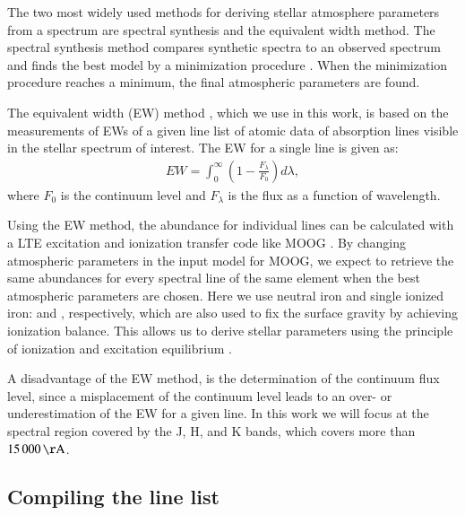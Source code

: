 \documentclass{aa}
\begin{document}
The two most widely used methods for deriving stellar atmosphere
parameters from a spectrum are spectral synthesis and the equivalent
width method. The spectral synthesis method compares synthetic spectra
to an observed spectrum and finds the best model by a minimization
procedure \citep[see e.g.][]{Valenti2005,Onehag2012,Blanco2014}. When
the minimization procedure reaches a minimum, the final atmospheric
parameters are found.

The equivalent width (EW) method
\citep{Sousa2008a,Bensby2014,Mucciarelli2013}, which we use in this
work, is based on the measurements of EWs of a given line list of atomic
data of absorption lines visible in the stellar spectrum of interest.
The EW for a single line is given as:
\begin{align}
    \label{eq:EW}
    EW = \int_0^\infty \left(1 - \frac{F_\lambda}{F_0}\right) d\lambda,
\end{align}
where $F_0$ is the continuum level and $F_\lambda$ is the flux as a
function of wavelength.

Using the EW method, the abundance for individual lines can be
calculated with a LTE excitation and ionization transfer code like
MOOG \citep{Sneden1973}. By changing atmospheric parameters in the
input model for MOOG, we expect to retrieve the same abundances for
every spectral line of the same element when the best atmospheric
parameters are chosen. Here we use neutral iron and single ionized
iron:  and , respectively, which are also used
to fix the surface gravity by achieving ionization balance. This allows
us to derive stellar parameters using the principle of ionization and
excitation equilibrium \citep{Gray2006}.

A disadvantage of the EW method, is the determination of the continuum
flux level, since a misplacement of the continuum level leads to an
over- or underestimation of the EW for a given line. In this work we
will focus at the spectral region covered by the J, H, and K bands,
which covers more than $\SI{15000}{\AA}$.



\subsection{Compiling the line list}
\end{document}
